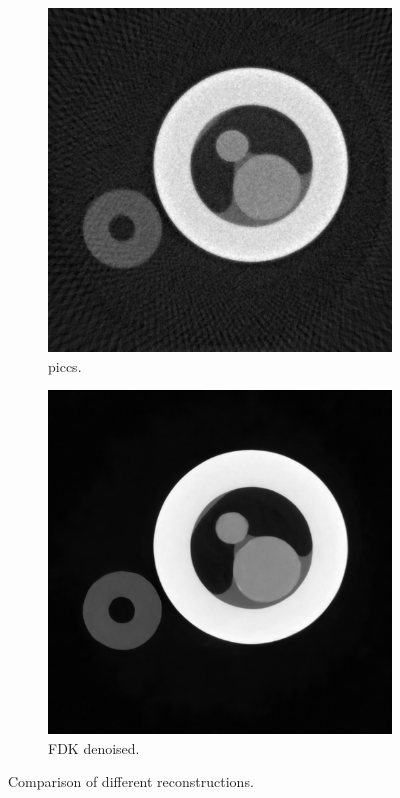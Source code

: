 \begin{figure}
    \medskip
  
    \begin{subfigure}[t]{.45\textwidth}
      \centering
      \includegraphics[width=\linewidth]{figures/kimrobertPICCS.png}
      \caption{\acrshort{piccs}. }
    \end{subfigure}
    \hfill
    \begin{subfigure}[t]{.45\textwidth}
      \centering
      \includegraphics[width=\linewidth]{figures/kimrobertdepth1dn.png}
      \caption{FDK denoised. }
    \end{subfigure}
    \caption[Comparison of different reconstructions]{Comparison of different reconstructions. }
    \label{fig:kimrobertcomparison}
\end{figure}

